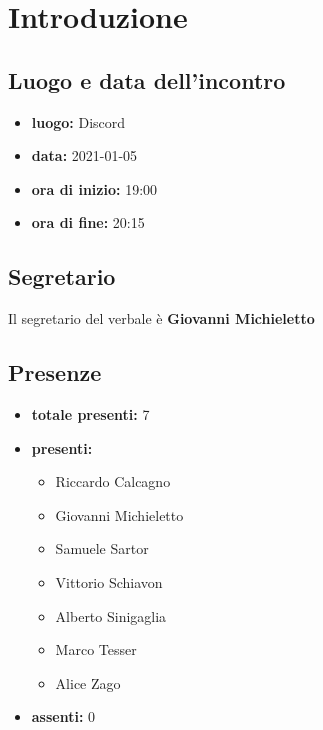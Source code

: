 \section{Introduzione}

\subsection{Luogo e data dell'incontro}
	\begin{itemize}
		\item \textbf{luogo:} Discord
		\item \textbf{data:} 2021-01-05
		\item \textbf{ora di inizio:} 19:00
		\item \textbf{ora di fine:} 20:15
	\end{itemize}

\subsection{Segretario}
Il segretario del verbale è \textbf{Giovanni Michieletto}

\subsection{Presenze}
	\begin{itemize}
		\item \textbf{totale presenti:} 7
		\item \textbf{presenti: }
			\begin{itemize}		
				\item Riccardo Calcagno
				\item Giovanni Michieletto
				\item Samuele Sartor
				\item Vittorio Schiavon
				\item Alberto Sinigaglia
				\item Marco Tesser
				\item Alice Zago
			\end{itemize}
		\item \textbf{assenti: } 0
	\end{itemize}


\newpage
